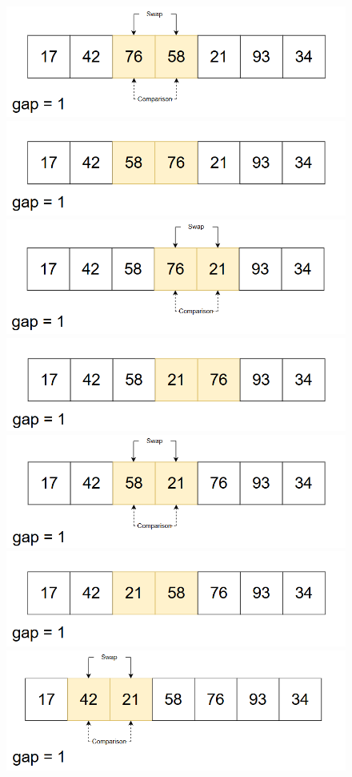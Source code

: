 \begin{figure}[H]
    \centering
    \includegraphics[width=0.5\linewidth]{img/shell_sort/09.png}
    \vspace{0.15cm}

    \includegraphics[width=0.5\linewidth]{img/shell_sort/10.png}
    \vspace{0.15cm}

    \includegraphics[width=0.5\linewidth]{img/shell_sort/11.png}
    \vspace{0.15cm}

    \includegraphics[width=0.5\linewidth]{img/shell_sort/12.png}
    \vspace{0.15cm}

    \includegraphics[width=0.5\linewidth]{img/shell_sort/13.png}
    \vspace{0.15cm}

    \includegraphics[width=0.5\linewidth]{img/shell_sort/14.png}
    \vspace{0.15cm}

    \includegraphics[width=0.5\linewidth]{img/shell_sort/15.png}
    \vspace{0.15cm}


\end{figure}
